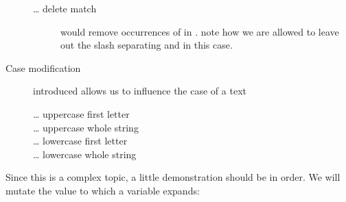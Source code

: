 \documentclass{olli-handout}
\begin{document}
\begin{description}
\begin{description}
        \item[\ldots{} delete match]  would remove occurrences of in . note how we are allowed to leave out the slash separating  and  in this case.
    \end{description}
    \item[Case modification] introduced  allows us to influence the case of a text
    \begin{description}
        \item[\ldots{} uppercase first letter] 
        \item[\ldots{} uppercase whole string] 
        \item[\ldots{} lowercase first letter] 
        \item[\ldots{} lowercase whole string] 
    \end{description}
\end{description}

Since this is a complex topic, a little demonstration should be in order. We will mutate the value to which a variable  expands:
\end{document}
